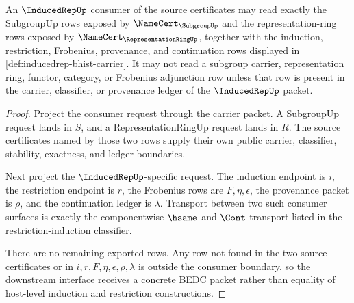 \begin{theorem}
\label{thm:inducedrep-subgroup-representationring-consumer-boundary}
An $\InducedRepUp$ consumer of the source certificates may read exactly the
SubgroupUp rows exposed by $\NameCert_{\SubgroupUp}$ and the
representation-ring rows exposed by $\NameCert_{\RepresentationRingUp}$,
together with the induction, restriction, Frobenius, provenance, and
continuation rows displayed in \autoref{def:inducedrep-bhist-carrier}. It may
not read a subgroup carrier, representation ring, functor, category, or
Frobenius adjunction row unless that row is present in the carrier,
classifier, or provenance ledger of the $\InducedRepUp$ packet.
\end{theorem}
\begin{proof}
Project the consumer request through the carrier packet. A SubgroupUp request
lands in $S$, and a RepresentationRingUp request lands in $R$. The source
certificates named by those two rows supply their own public carrier,
classifier, stability, exactness, and ledger boundaries.

Next project the $\InducedRepUp$-specific request. The induction endpoint is
$i$, the restriction endpoint is $r$, the Frobenius rows are
$F,\eta,\epsilon$, the provenance packet is $\rho$, and the continuation
ledger is $\lambda$. Transport between two such consumer surfaces is exactly
the componentwise $\hsame$ and $\Cont$ transport listed in the
restriction-induction classifier.

There are no remaining exported rows. Any row not found in the two source
certificates or in $i,r,F,\eta,\epsilon,\rho,\lambda$ is outside the consumer
boundary, so the downstream interface receives a concrete BEDC packet rather
than equality of host-level induction and restriction constructions.
\end{proof}

